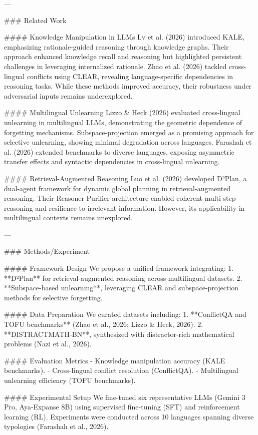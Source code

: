 ---

### Related Work  

#### Knowledge Manipulation in LLMs  
Lv et al. (2026) introduced KALE, emphasizing rationale-guided reasoning through knowledge graphs. Their approach enhanced knowledge recall and reasoning but highlighted persistent challenges in leveraging internalized rationale. Zhao et al. (2026) tackled cross-lingual conflicts using CLEAR, revealing language-specific dependencies in reasoning tasks. While these methods improved accuracy, their robustness under adversarial inputs remains underexplored.

#### Multilingual Unlearning  
Lizzo & Heck (2026) evaluated cross-lingual unlearning in multilingual LLMs, demonstrating the geometric dependence of forgetting mechanisms. Subspace-projection emerged as a promising approach for selective unlearning, showing minimal degradation across languages. Farashah et al. (2026) extended benchmarks to diverse languages, exposing asymmetric transfer effects and syntactic dependencies in cross-lingual unlearning.  

#### Retrieval-Augmented Reasoning  
Luo et al. (2026) developed D²Plan, a dual-agent framework for dynamic global planning in retrieval-augmented reasoning. Their Reasoner-Purifier architecture enabled coherent multi-step reasoning and resilience to irrelevant information. However, its applicability in multilingual contexts remains unexplored.

---

### Methods/Experiment  

#### Framework Design  
We propose a unified framework integrating:  
1. **D²Plan** for retrieval-augmented reasoning across multilingual datasets.  
2. **Subspace-based unlearning**, leveraging CLEAR and subspace-projection methods for selective forgetting.  

#### Data Preparation  
We curated datasets including:  
1. **ConflictQA and TOFU benchmarks** (Zhao et al., 2026; Lizzo & Heck, 2026).  
2. **DISTRACTMATH-BN**, synthesized with distractor-rich mathematical problems (Nazi et al., 2026).  

#### Evaluation Metrics  
- Knowledge manipulation accuracy (KALE benchmarks).  
- Cross-lingual conflict resolution (ConflictQA).  
- Multilingual unlearning efficiency (TOFU benchmarks).  

#### Experimental Setup  
We fine-tuned six representative LLMs (Gemini 3 Pro, Aya-Expanse 8B) using supervised fine-tuning (SFT) and reinforcement learning (RL). Experiments were conducted across 10 languages spanning diverse typologies (Farashah et al., 2026).

